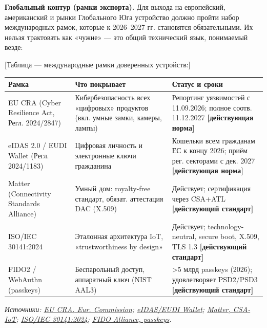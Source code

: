 \documentclass[
  russian,
]{article}
\begin{document}
\textbf{Глобальный контур (рамки экспорта).} Для выхода на европейский,
американский и рынки Глобального Юга устройство должно пройти набор
международных рамок, которые к 2026--2027 гг. становятся обязательными.
Их нельзя трактовать как «чужие» --- это общий технический язык,
понимаемый везде:

{[}Таблица --- международные рамки доверенных устройств:{]}

\begin{longtable}[]{@{}
  >{\raggedright\arraybackslash}p{}
  >{\raggedright\arraybackslash}p{}
  >{\raggedright\arraybackslash}p{}@{}}
\toprule\noalign{}
\begin{minipage}[b]{\linewidth}\raggedright
Рамка
\end{minipage} & \begin{minipage}[b]{\linewidth}\raggedright
Что покрывает
\end{minipage} & \begin{minipage}[b]{\linewidth}\raggedright
Статус и сроки
\end{minipage} \\
\midrule\noalign{}
\endhead
\bottomrule\noalign{}
\endlastfoot
EU CRA (Cyber Resilience Act, Регл. 2024/2847) & Кибербезопасность всех
«цифровых» продуктов (вкл. умные замки, камеры, лампы) & Репортинг
уязвимостей с 11.09.2026; полное соотв. 11.12.2027
\textbf{{[}действующая норма{]}} \\
eIDAS 2.0 / EUDI Wallet (Регл. 2024/1183) & Цифровая личность и
электронные ключи гражданина & Кошельки всем гражданам ЕС к концу 2026;
приём рег. секторами с дек. 2027 \textbf{{[}действующая норма{]}} \\
Matter (Connectivity Standards Alliance) & Умный дом: royalty-free
стандарт, обязат. аттестация DAC (X.509) & Действует; сертификация через
CSA+ATL \textbf{{[}действующий стандарт{]}} \\
ISO/IEC 30141:2024 & Эталонная архитектура IoT, «trustworthiness by
design» & Действует; technology-neutral, secure boot, X.509, TLS 1.3
\textbf{{[}действующий стандарт{]}} \\
FIDO2 / WebAuthn (passkeys) & Беспарольный доступ, аппаратный ключ (NIST
AAL3) & \textgreater5 млрд passkeys (2026); удовлетворяет PSD2/PSD3
\textbf{{[}действующий стандарт{]}} \\
\end{longtable}

\emph{Источники:
\href{https://digital-strategy.ec.europa.eu/en/policies/cyber-resilience-act}{EU
CRA, Eur. Commission};
\href{https://digital-strategy.ec.europa.eu/en/policies/eudi-regulation}{eIDAS/EUDI
Wallet}; \href{https://csa-iot.org/all-solutions/matter/}{Matter,
CSA-IoT}; \href{https://www.iso.org/standard/88800.html}{ISO/IEC
30141:2024}; \href{https://fidoalliance.org/passkeys/}{FIDO Alliance,
passkeys}.}
\end{document}
